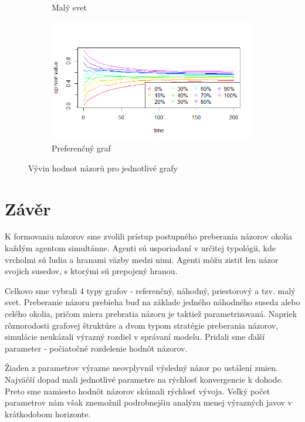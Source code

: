 \documentclass[10pt,a4paper]{report}
\begin{document}
\begin{figure}[h]
\begin{subfigure}[b]{0.475\textwidth}
      \caption[]%
      {{\small Malý svet}}    
      \label{fig:prubeh-maly svet}
  \end{subfigure}
  \quad
  \begin{subfigure}[b]{0.475\textwidth}   
      \centering 
      \includegraphics[width=\textwidth]{plots/max-values/prefferentialMaxV.png}
      \caption[]%
      {{\small Preferenčný graf}}    
      \label{fig:prubeh-preferencni}
  \end{subfigure}
  \caption[]
  {\small Vývin hodnot názorů pro jednotlivé grafy}
  \label{fig:prubeh-grafy}
\end{figure}
 
\chapter{Závěr}
K formovaniu názorov sme zvolili prístup postupného preberania názorov okolia každým agentom simultánne. Agenti sú usporiadaní v určitej typológii, kde vrcholmi sú ľudia a hranami väzby medzi nimi. Agenti môžu zistiť len názor svojich susedov, s ktorými sú prepojený hranou. 

Celkovo sme vybrali 4 typy grafov - referenčný, náhodný, priestorový a tzv. malý svet. Preberanie názoru prebieha buď na základe jedného náhodného suseda alebo celého okolia, pričom miera prebratia názoru je taktiež parametrizovaná. Napriek rôznorodosti grafovej štruktúre a dvom typom stratégie preberania názorov, simulácie neukázali výrazný rozdiel v správaní modelu. Pridali sme ďalší parameter - počiatočné rozdelenie hodnôt názorov.

Žiaden z parametrov výrazne neovplyvnil výsledný názor po ustálení zmien. Najväčší dopad mali jednotlivé parametre na rýchlosť konvergencie k dohode. Preto sme namiesto hodnôt názorov skúmali rýchlosť vývoja. Veľký počet parametrov nám však znemožnil podrobnejšiu analýzu menej výrazných javov v krátkodobom horizonte.
\end{document}

